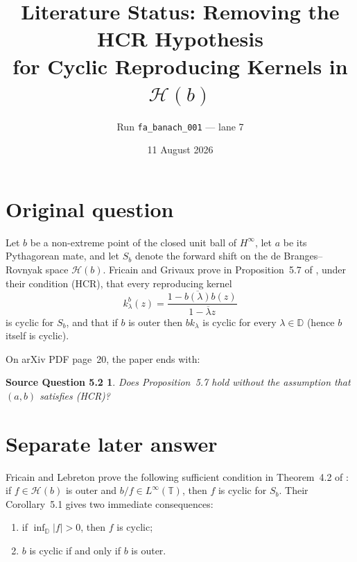 \documentclass[11pt]{article}
\title{Literature Status: Removing the HCR Hypothesis\\
for Cyclic Reproducing Kernels in $\mathcal H(b)$}
\author{Run \texttt{fa\_banach\_001} --- lane 7}
\date{11 August 2026}
\newtheorem*{question}{Source Question 5.2}
\begin{document}
\maketitle

\begin{center}
\end{center}

\section{Original question}

Let $b$ be a non-extreme point of the closed unit ball of $H^\infty$, let
$a$ be its Pythagorean mate, and let $S_b$ denote the forward shift on the
de Branges--Rovnyak space $\mathcal H(b)$.  Fricain and Grivaux prove in
Proposition~5.7 of \cite{source}, under their condition (HCR), that every
reproducing kernel
\[
 k^b_\lambda(z)=\frac{1-\overline{b(\lambda)}b(z)}
                         {1-\overline\lambda z}
\]
is cyclic for $S_b$, and that if $b$ is outer then $bk_\lambda$ is cyclic
for every $\lambda\in\mathbb D$ (hence $b$ itself is cyclic).

On arXiv PDF page~20, the paper ends with:

\begin{question}
Does Proposition~5.7 hold without the assumption that $(a,b)$ satisfies
(HCR)?
\end{question}

\section{Separate later answer}

Fricain and Lebreton prove the following sufficient condition in
Theorem~4.2 of \cite{answerpaper}: if $f\in\mathcal H(b)$ is outer and
$b/f\in L^\infty(\mathbb T)$, then $f$ is cyclic for $S_b$.  Their
Corollary~5.1 gives two immediate consequences:
\begin{enumerate}
\item if $\inf_{\mathbb D}|f|>0$, then $f$ is cyclic;
\item $b$ is cyclic if and only if $b$ is outer.
\end{enumerate}
\end{document}

